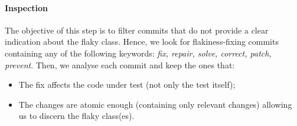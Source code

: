 
\paragraph{Inspection}
The objective of this step is to filter commits that do not provide a clear indication about the flaky class. Hence, we look for flakiness-fixing commits containing any of the following keywords: \textit{fix, repair, solve, correct, patch, prevent}. Then, we analyse each commit and keep the ones that:
\begin{itemize}[wide=0pt,noitemsep,topsep=0pt]
    \item The fix affects the code under test 
    (not only the test itself);
    \item The changes are atomic enough (\ie containing only relevant changes) allowing us to discern the flaky class(es). 
\end{itemize}

